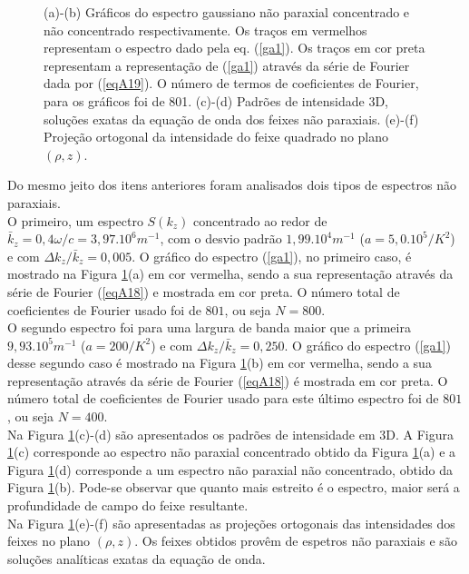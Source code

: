 \begin{figure}[h]
\caption{(a)-(b) Gr\'aficos do espectro gaussiano n\~ao paraxial concentrado e n\~ao concentrado respectivamente. Os tra\c{c}os em vermelhos representam o espectro dado pela eq. (\ref{ga1}). Os tra\c{c}os em cor preta representam a representa\c{c}\~ao de (\ref{ga1}) atrav\'es da s\'erie de Fourier dada por (\ref{eqA19}). O n\'umero de termos de coeficientes de Fourier, para os  gr\'aficos foi de 801. (c)-(d) Padr\~oes de intensidade 3D, solu\c{c}\~oes exatas da equa\c{c}\~ao de onda dos feixes n\~ao paraxiais. (e)-(f) Proje\c{c}\~ao ortogonal da intensidade do feixe quadrado no plano $(\rho,z)$.}
\label{fig3}
\end{figure}
Do mesmo jeito dos itens anteriores foram analisados dois tipos de espectros n\~ao paraxiais.\\
O primeiro, um espectro $S(k_z)$ concentrado ao redor de $\bar{k}_z = 0,4\omega /c=3,97.10^6 m^{-1}$, com o desvio padr\~ao $1,99.10^{4}m^{-1}$ ($a=5,0.10^5/K^2$) e com $\Delta k_z/\bar{k}_z=0,005$. O gr\'afico do espectro (\ref{ga1}), no primeiro caso, \'e mostrado na Figura \ref{fig3}(a) em cor vermelha, sendo a sua representa\c{c}\~ao atrav\'es da s\'erie de Fourier (\ref{eqA18}) e mostrada em cor preta. O n\'umero total de coeficientes de Fourier usado foi de $801$, ou seja $N=800$.\\
O segundo espectro foi para uma largura de banda maior que a primeira $9,93.10^{5}m^{-1}$ ($a=200/K^2$) e com $\Delta k_z/\bar{k}_z=0,250$. O gr\'afico do espectro (\ref{ga1}) desse segundo caso \'e mostrado na Figura \ref{fig3}(b) em cor vermelha, sendo a sua representa\c{c}\~ao atrav\'es da s\'erie de Fourier (\ref{eqA18}) \'e mostrada em cor preta. O n\'umero total de coeficientes de Fourier usado para este \'ultimo espectro foi de $801$, ou seja $N=400$.\\
Na Figura \ref{fig3}(c)-(d) s\~ao apresentados os padr\~oes de intensidade em 3D. A Figura \ref{fig3}(c) corresponde ao espectro n\~ao paraxial concentrado obtido da Figura \ref{fig3}(a) e a Figura \ref{fig3}(d) corresponde a um espectro n\~ao paraxial n\~ao concentrado, obtido da Figura \ref{fig3}(b). Pode-se observar que quanto mais estreito \'e o espectro, maior ser\'a a profundidade de campo do feixe resultante.\\
Na Figura \ref{fig3}(e)-(f) s\~ao apresentadas as proje\c{c}\~oes ortogonais das intensidades dos feixes no plano $(\rho,z)$.  Os feixes obtidos prov\^em de espetros n\~ao paraxiais e s\~ao solu\c{c}\~oes anal\'iticas exatas da equa\c{c}\~ao de onda.\\
